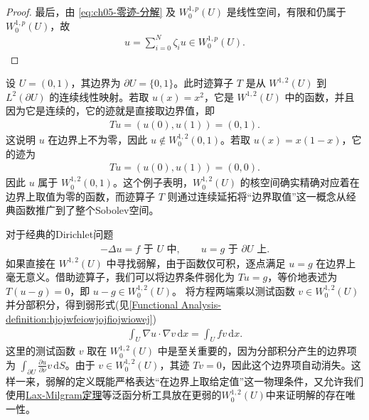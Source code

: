 \documentclass[../../main.tex]{subfiles}
\begin{document}
\begin{proof}
最后，由 \eqref{eq:ch05-零迹-分解} 及 $W^{1,p}_{0}(U)$ 是线性空间，有限和仍属于 $W^{1,p}_{0}(U)$，故
\begin{align*}
u=\sum_{i=0}^{N}\zeta_{i}u\in W^{1,p}_{0}(U).
\end{align*}
\end{proof}

\begin{examples}
设 \(U = (0,1)\)，其边界为 \(\partial U = \{0, 1\}\)。此时迹算子 \(T\) 是从 \(W^{1,2}(U)\) 到 \(L^2(\partial U)\) 的连续线性映射。若取 \(u(x) = x^2\)，它是 \(W^{1,2}(U)\) 中的函数，并且因为它是连续的，它的迹就是直接取边界值，即
\begin{align*}
Tu = (u(0), u(1)) = (0, 1).
\end{align*}
这说明 \(u\) 在边界上不为零，因此 \(u \notin W_0^{1,2}(0,1)\)。若取 \(u(x) = x(1-x)\)，它的迹为
\begin{align*}
Tu = (u(0), u(1)) = (0, 0).
\end{align*}
因此 \(u\) 属于 \(W_0^{1,2}(0,1)\)。这个例子表明，\(W_0^{1,2}(U)\) 的核空间确实精确对应着在边界上取值为零的函数，而迹算子 \(T\) 则通过连续延拓将“边界取值”这一概念从经典函数推广到了整个Sobolev空间。
\end{examples}

\begin{examples}
对于经典的Dirichlet问题
\begin{align*}
-\Delta u = f \text{ 于 } U \text{ 中}, \qquad u = g \text{ 于 } \partial U \text{ 上}.
\end{align*}
如果直接在 \(W^{1,2}(U)\) 中寻找弱解，由于函数仅可积，逐点满足 \(u = g\) 在边界上毫无意义。借助迹算子，我们可以将边界条件弱化为 \(Tu = g\)，等价地表述为 \(T(u-g) = 0\)，即 \(u - g \in W_0^{1,2}(U)\)。
将方程两端乘以测试函数 \(v \in W_0^{1,2}(U)\) 并分部积分，得到弱形式(见\cref{Functional Analysis-definition:hjojwfeiowjojfiojwiowej})
\begin{align*}
\int_U \nabla u \cdot \nabla v \, \mathrm{d}x = \int_U f v \, \mathrm{d}x.
\end{align*}
这里的测试函数 \(v\) 取在 \(W_0^{1,2}(U)\) 中是至关重要的，因为分部积分产生的边界项为 \(\int_{\partial U} \frac{\partial u}{\partial \nu} v \, \mathrm{d}S\)。由于 \(v \in W_0^{1,2}(U)\)，其迹 \(Tv = 0\)，因此这个边界项自动消失。这样一来，弱解的定义既能严格表达“在边界上取给定值”这一物理条件，又允许我们使用\hyperref[Functional Analysis-theorem:泛函分析--Lax-Milgram定理]{Lax-Milgram定理}等泛函分析工具放在更弱的$W_0^{1,2}(U)$中来证明解的存在唯一性。
\end{examples}
\end{document}
